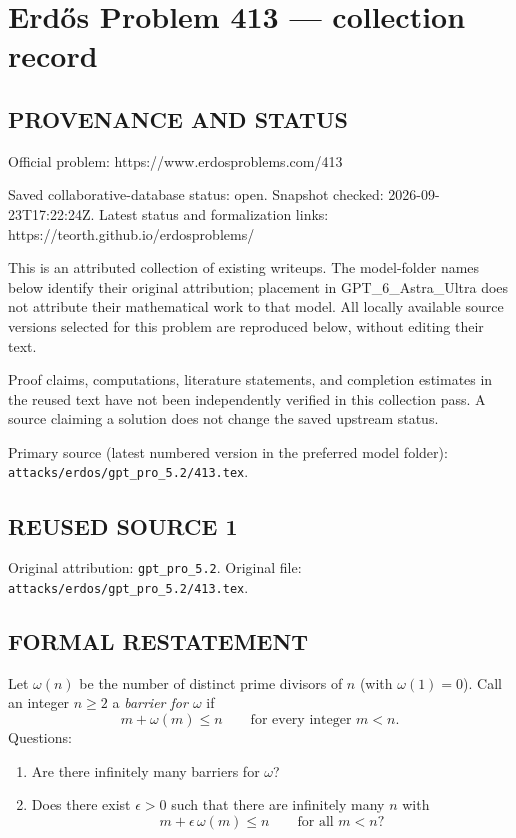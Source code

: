 \section*{Erd\H{o}s Problem 413 --- collection record}

\subsection*{PROVENANCE AND STATUS}
Official problem: https://www.erdosproblems.com/413

Saved collaborative-database status: open.
Snapshot checked: 2026-09-23T17:22:24Z.
Latest status and formalization links: https://teorth.github.io/erdosproblems/

This is an attributed collection of existing writeups. The model-folder names below identify their original attribution; placement in GPT\_6\_Astra\_Ultra does not attribute their mathematical work to that model. All locally available source versions selected for this problem are reproduced below, without editing their text.

Proof claims, computations, literature statements, and completion estimates in the reused text have not been independently verified in this collection pass. A source claiming a solution does not change the saved upstream status.

Primary source (latest numbered version in the preferred model folder): \texttt{attacks/erdos/gpt\_pro\_5.2/413.tex}.

\subsection*{REUSED SOURCE 1}
Original attribution: \texttt{gpt\_pro\_5.2}.
Original file: \texttt{attacks/erdos/gpt\_pro\_5.2/413.tex}.


\subsection*{FORMAL RESTATEMENT}
Let $\omega(n)$ be the number of distinct prime divisors of $n$ (with $\omega(1)=0$).
Call an integer $n\ge2$ a \emph{barrier for $\omega$} if
\[
  m+\omega(m)\le n\qquad\text{for every integer }m<n.
\]
Questions:
\begin{enumerate}
  \item Are there infinitely many barriers for $\omega$?
  \item Does there exist $\epsilon>0$ such that there are infinitely many $n$ with
  $$m+\epsilon\,\omega(m)\le n\qquad\text{for all }m<n?$$
\end{enumerate}

